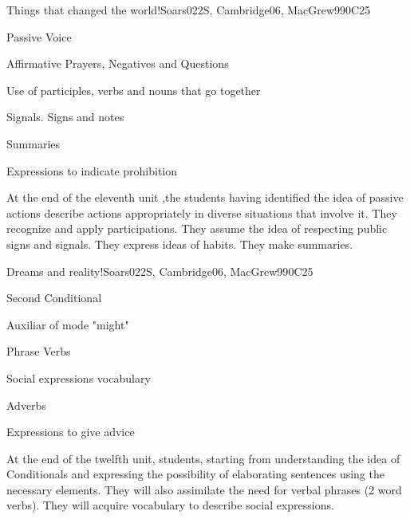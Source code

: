 \begin{syllabus}
\begin{unit}{Things that changed the world!}{}{Soars022S, Cambridge06, MacGrew99}{0}{C25}
   \begin{topics}
       \item Passive Voice
       \item Affirmative Prayers, Negatives and Questions
       \item Use of participles, verbs and nouns that go together
       \item Signals. Signs and notes
       \item Summaries
       \item Expressions to indicate prohibition
    \end{topics}

   \begin{learningoutcomes}
      \item At the end of the eleventh unit ,the students having identified the idea of passive actions describe actions appropriately in diverse situations that involve it. They recognize and apply participations. They assume the idea of respecting public signs and signals. They express ideas of habits. They make summaries.
   \end{learningoutcomes}
\end{unit}

\begin{unit}{Dreams and reality!}{}{Soars022S, Cambridge06, MacGrew99}{0}{C25}
   \begin{topics}
       \item Second Conditional
       \item Auxiliar of mode "might"
       \item Phrase Verbs
       \item Social expressions vocabulary
       \item Adverbs
       \item Expressions to give advice
   \end{topics}

   \begin{learningoutcomes}
      \item At the end of the twelfth unit, students, starting from understanding the idea of Conditionals and expressing the possibility of elaborating sentences using the necessary elements. They will also assimilate the need for verbal phrases (2 word verbs). They will acquire vocabulary to describe social expressions.
   \end{learningoutcomes}
\end{unit}


\end{syllabus}
